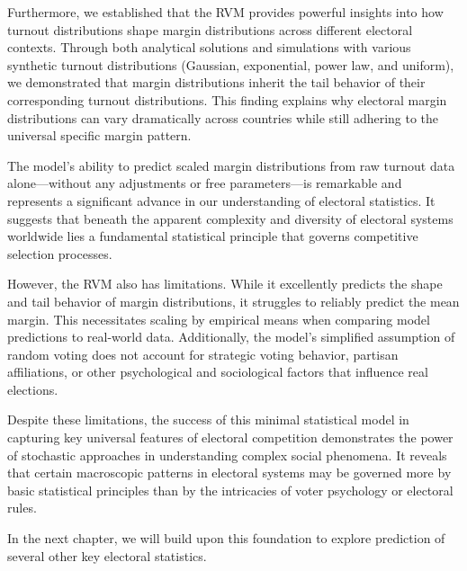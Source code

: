 Furthermore, we established that the RVM provides powerful insights into how turnout distributions shape margin distributions across different electoral contexts. Through both analytical solutions and simulations with various synthetic turnout distributions (Gaussian, exponential, power law, and uniform), we demonstrated that margin distributions inherit the tail behavior of their corresponding turnout distributions. This finding explains why electoral margin distributions can vary dramatically across countries while still adhering to the universal specific margin pattern.

The model's ability to predict scaled margin distributions from raw turnout data alone—without any adjustments or free parameters—is remarkable and represents a significant advance in our understanding of electoral statistics. It suggests that beneath the apparent complexity and diversity of electoral systems worldwide lies a fundamental statistical principle that governs competitive selection processes.

However, the RVM also has limitations. While it excellently predicts the shape and tail behavior of margin distributions, it struggles to reliably predict the mean margin. This necessitates scaling by empirical means when comparing model predictions to real-world data. Additionally, the model's simplified assumption of random voting does not account for strategic voting behavior, partisan affiliations, or other psychological and sociological factors that influence real elections.

Despite these limitations, the success of this minimal statistical model in capturing key universal features of electoral competition demonstrates the power of stochastic approaches in understanding complex social phenomena. It reveals that certain macroscopic patterns in electoral systems may be governed more by basic statistical principles than by the intricacies of voter psychology or electoral rules.

In the next chapter, we will build upon this foundation to explore prediction of several other key electoral statistics.
